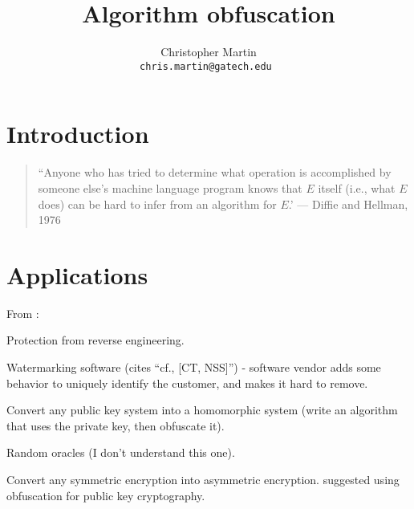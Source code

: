 \documentclass[10pt,twocolumn]{article}
\title{Algorithm obfuscation}
\date{}
\author{
  \begin{tabular}{c c c}
    Christopher Martin \\
    \small \tt{chris.martin@gatech.edu}
  \end{tabular}
}
\begin{document}
  \thispagestyle{empty}


  \section{Introduction}

    \begin{quote}
      ``Anyone who has tried to determine what operation is accomplished by someone else's machine language
      program knows that $E$ itself (i.e., what $E$ does) can be hard to infer from an algorithm for $E$.'
       --- Diffie and Hellman, 1976 \cite{newDirections}
    \end{quote}


  \section{Applications}

    From \cite{onThe(Im)possibility}:

    Protection from reverse engineering.

    Watermarking software (cites ``cf., [CT, NSS]'') -
    software vendor adds some behavior to uniquely identify the
    customer, and makes it hard to remove.

    Convert any public key system into a homomorphic system
    (write an algorithm that uses the private key, then obfuscate it).

    Random oracles (I don't understand this one).

    Convert any symmetric encryption into asymmetric encryption.
    \cite{newDirections} suggested using obfuscation for public key cryptography.
\end{document}
